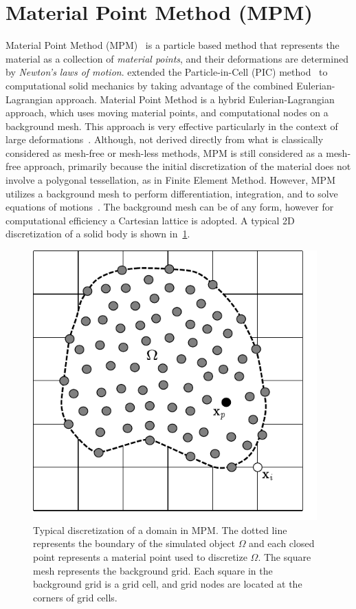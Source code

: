 \section{Material Point Method (MPM)}
Material Point Method (MPM)~\citep{Sulsky1994,Sulsky1995} is a particle based 
method that represents the material as a collection of \textit{material 
points}, and their deformations are determined by \textit{Newton's laws of 
motion}. \citet{Sulsky1994} extended the Particle-in-Cell (PIC) 
method~\citep{harlow1964} to computational solid mechanics by taking advantage 
of the combined Eulerian-Lagrangian approach. Material Point Method is a hybrid 
Eulerian-Lagrangian approach, which uses moving material points, and 
computational nodes on a background mesh. This approach is very effective 
particularly in the context of large 
deformations~\citep{mackenzie2010,shin2010}. Although, not derived directly 
from what is classically considered as mesh-free or mesh-less methods, MPM is 
still considered as a mesh-free approach, primarily because the initial 
discretization of the material does not involve a polygonal tessellation, as in 
Finite Element Method. However, MPM utilizes a background mesh to perform 
differentiation, integration, and to solve equations of 
motions~\citep{Steffen2008}. The background mesh can be of any form, however 
for computational efficiency a Cartesian lattice is adopted. A typical 2D 
discretization of a solid body is shown in~\cref{fig:MPM}. 
\begin{figure}[htbp]
\centering
\includegraphics[width=0.975\textwidth]{MPM}
\caption[Typical discretization of a domain in MPM]{Typical discretization of a 
domain in MPM. The dotted line represents the boundary of the simulated object 
$\Omega$ and each closed point represents a material point used to discretize 
$\Omega$. The square mesh represents the background grid. Each square in the 
background grid is a grid cell, and grid nodes are located at the corners of 
grid cells.}
\label{fig:MPM}
\end{figure}

